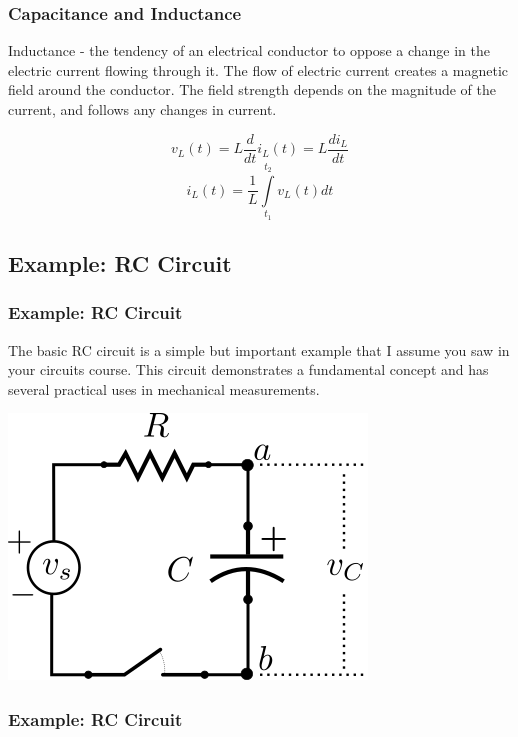 \documentclass[fleqn]{beamer} %
\newcommand{\sectionIsubsectionIIItitle}{Capacitance and Inductance}
\newcommand{\sectionIsubsectionIVtitle}{Example: RC Circuit}
\begin{document}
			\begin{frame} 
				\frametitle{\sectionIsubsectionIIItitle}

	{\RD Inductance} - the tendency of an electrical conductor to oppose a change in the electric current flowing through it. The flow of electric current creates a magnetic field around the conductor. The field strength depends on the magnitude of the current, and follows any changes in current. \vspc
	
	\begin{fleqn}
	\[v_L(t)=L\frac{d}{dt}i_L(t)=L\frac{di_L}{dt} \] 	
	\[i_L(t)=\frac{1}{L}\int\limits_{t_1}^{t_2}v_L\left(t\right)dt \]
	\end{fleqn}



				
			\end{frame}	

		\subsection{\sectionIsubsectionIVtitle}\label{sectionIsubsectionIV}	

			\begin{frame}
				\frametitle{\sectionIsubsectionIVtitle}

				\bigskip


	The basic RC circuit is a simple but important example that I assume you saw in your circuits course. This circuit demonstrates a fundamental concept and has several practical uses in mechanical measurements. \vspc
	
	\includegraphics[scale=0.5]{images/rc_circuit.png}


		
				
			\end{frame}

			\begin{frame}
				\frametitle{\sectionIsubsectionIVtitle}

\bigskip


			\end{frame}
\end{document}
